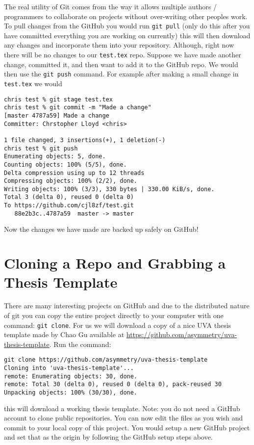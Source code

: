 \documentclass{article}
\begin{document}
The real utility of Git comes from the way it allows multiple authors
/ programmers to collaborate on projects without over-writing other
peoples work. To pull changes from the GitHub you would run
\lstinline{git pull} (only do this after you have committed everything
you are working on currently) this will then download any changes and
incorporate them into your repository. Although, right now there will
be no changes to our \lstinline{test.tex} repo. Suppose we have made
another change, committed it, and then want to add it to the GitHub
repo. We would then use the \lstinline{git push} command. For example
after making a small change in \lstinline{test.tex} we would 
\begin{lstlisting}
chris test % git stage test.tex
chris test % git commit -m "Made a change"
[master 4787a59] Made a change
Committer: Chrstopher Lloyd <chris>

1 file changed, 3 insertions(+), 1 deletion(-)
chris test % git push
Enumerating objects: 5, done.
Counting objects: 100% (5/5), done.
Delta compression using up to 12 threads
Compressing objects: 100% (2/2), done.
Writing objects: 100% (3/3), 330 bytes | 330.00 KiB/s, done.
Total 3 (delta 0), reused 0 (delta 0)
To https://github.com/cjl8zf/test.git
   88e2b3c..4787a59  master -> master
\end{lstlisting}

Now the changes we have made are backed up safely on GitHub!

\section{Cloning a Repo and Grabbing a Thesis Template}
There are many interesting projects on GitHub and due to the
distributed nature of git you can copy the entire project directly
to your computer with one command: \lstinline{git clone}. For us we
will download a copy of a nice UVA thesis template made by Chao Gu
available at
\href{https://github.com/asymmetry/uva-thesis-template}{https://github.com/asymmetry/uva-thesis-template}. Run
the command:
\begin{lstlisting}
git clone https://github.com/asymmetry/uva-thesis-template
Cloning into 'uva-thesis-template'...
remote: Enumerating objects: 30, done.
remote: Total 30 (delta 0), reused 0 (delta 0), pack-reused 30
Unpacking objects: 100% (30/30), done.
\end{lstlisting}
this will download a working thesis template. Note: you do not need a
GitHub account to clone public repositories. You can now edit the
files as you wish and commit to your local copy of this project. You
would setup a new GitHub project and set that as the origin by
following the GitHub setup steps above.
\end{document}
